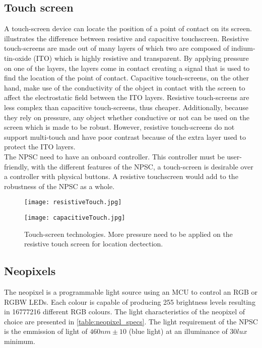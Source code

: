 \subsection{Touch screen}
A touch-screen device can locate the position of a point of contact on its screen. 
 illustrates the difference between resistive and capacitive touchscreen. Resistive touch-screens are made out of many layers of which two are composed of indium-tin-oxide (ITO) which is highly resistive and transparent. By applying pressure on one of the layers, the layers come in contact creating a signal that is used to find the location of the point of contact. Capacitive touch-screens, on the other hand, make use of the conductivity of the object in contact with the screen to affect the electrostatic field between the ITO layers. Resistive touch-screens are less complex than capacitive touch-screens, thus cheaper. Additionally, because they rely on pressure, any object whether conductive or not can be used on the screen which is made to be robust. However, resistive touch-screens do not support multi-touch and have poor contrast because of the extra layer used to protect the ITO layers.\\
The NPSC need to have an onboard controller. This controller must be user-friendly, with the different features of the NPSC, a touch-screen is desirable over a controller with physical buttons. A resistive touchscreen would add to the robustness of the NPSC as a whole.   
\begin{figure}[h!]
\centering
\begin{minipage}[b]{0.45\textwidth}
\texttt{[image: resistiveTouch.jpg]}
\label{fig:resistive_screen}
\end{minipage}
\begin{minipage}[b]{0.45\textwidth}
\texttt{[image: capacitiveTouch.jpg]}
\label{fig:capacitive_screen}
\end{minipage}
\caption{Touch-screen technologies. More pressure need to be applied on the resistive touch screen for location dectection.}
\label{fig:screen}
\end{figure}    

\subsection{Neopixels}\label{neopixels}
The neopixel is a programmable light source using an MCU to control an RGB or RGBW LEDs. Each colour is capable of producing 255 brightness levels resulting in 16777216 different RGB colours. 
The light characteristics of the neopixel of choice are presented in \cref{table:neopixel_specs}. The light requirement of the NPSC is the emmission of light of $460nm\pm10$ (blue light) at an illuminance of $30lux$ minimum.


